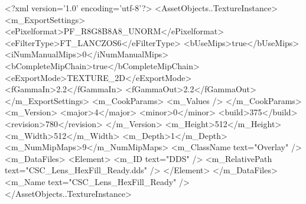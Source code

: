 <?xml version='1.0' encoding='utf-8'?>
<AssetObjects..TextureInstance>
  <m_ExportSettings>
    <ePixelformat>PF_R8G8B8A8_UNORM</ePixelformat>
    <eFilterType>FT_LANCZOS6</eFilterType>
    <bUseMips>true</bUseMips>
    <iNumManualMips>0</iNumManualMips>
    <bCompleteMipChain>true</bCompleteMipChain>
    <eExportMode>TEXTURE_2D</eExportMode>
    <fGammaIn>2.2</fGammaIn>
    <fGammaOut>2.2</fGammaOut>
  </m_ExportSettings>
  <m_CookParams>
    <m_Values />
  </m_CookParams>
  <m_Version>
    <major>4</major>
    <minor>0</minor>
    <build>375</build>
    <revision>780</revision>
  </m_Version>
  <m_Height>512</m_Height>
  <m_Width>512</m_Width>
  <m_Depth>1</m_Depth>
  <m_NumMipMaps>9</m_NumMipMaps>
  <m_ClassName text="Overlay" />
  <m_DataFiles>
    <Element>
      <m_ID text="DDS" />
      <m_RelativePath text="CSC_Lens_HexFill_Ready.dds" />
    </Element>
  </m_DataFiles>
  <m_Name text="CSC_Lens_HexFill_Ready" />
</AssetObjects..TextureInstance>

